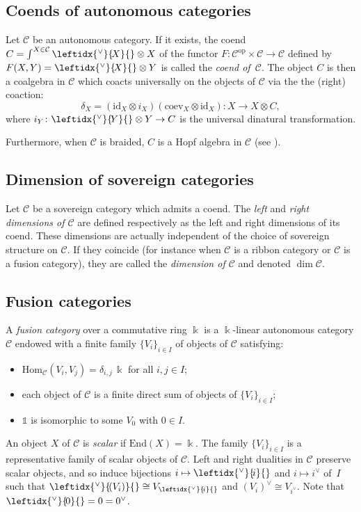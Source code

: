 \documentclass[a4paper]{amsart}
\theoremstyle{definition}
\newcommand{\co}{\colon}
\newcommand{\id}{\mathrm{id}}
\newcommand{\opp}{\mathrm{op}}
\newcommand{\cc}{\mathcal{C}}
\newcommand{\kk}{\Bbbk}
\newcommand{\kt}{$\Bbbk$\nobreakdash-\hspace{0pt}}
\newcommand{\un}{\mathbb{1}}
\newcommand{\End}{\mathrm{End}}
\newcommand{\Hom}{\mathrm{Hom}}
\newcommand{\lcoev}{\mathrm{coev}}
\newcommand{\ldual}[1]{\leftidx{^\vee}{\!#1}{}}
\newcommand{\rdual}[1]{{#1}^\vee}
\begin{document}
\subsection{Coends of autonomous categories}\label{sect-coend-cat}
Let $\cc$ be an autonomous category. If it exists, the coend $C=\int^{X \in \cc} \ldual{X} \otimes X$ of the functor $F\co
\cc^\opp \times \cc \to \cc$ defined by $F(X,Y)=\ldual{X}\otimes Y$ is called the \emph{coend of~$\cc$}. The object $C$ is
then a coalgebra in $\cc$ which coacts universally on the objects of $\cc$ via the the (right) coaction:
\begin{equation*}
\delta_X=(\id_X \otimes i_X)(\lcoev_X \otimes \id_X) \co X \to X \otimes C,
\end{equation*}
where $i_Y \co \ldual{Y} \otimes Y \to C$ is the universal dinatural transformation.

Furthermore, when $\cc$ is braided, $C$ is a Hopf algebra in $\cc$ (see \cite{Maj1,Lyu1}).

\subsection{Dimension of sovereign categories}
Let $\cc$ be a sovereign category which admits a coend. The \emph{left} and \emph{right dimensions of $\cc$} are defined respectively as the left and right dimensions of its coend. These dimensions are actually independent of the choice of sovereign structure on $\cc$. If they coincide (for instance when $\cc$ is a ribbon category or $\cc$ is a fusion category), they are called the \emph{dimension of $\cc$} and denoted $\dim \cc$.

\subsection{Fusion categories}\label{sect-fusion} A \emph{fusion category} over a commutative ring $\kk$ is
a \kt linear autonomous category $\cc$ endowed with a finite family $\{V_i\}_{i \in I}$ of objects of $\cc$ satisfying:
\begin{itemize}
\item $\Hom_\cc(V_i,V_j)=\delta_{i,j} \, \kk$ for all $i,j \in I$;
\item each object of $\cc$ is a finite direct sum of objects of $\{V_i\}_{i \in I}$;
\item $\un$ is isomorphic to some $V_0$ with $0 \in I$.
\end{itemize}

An object $X$ of $\cc$ is \emph{scalar} if  $\End(X)=\kk$. The family $\{V_i\}_{i \in I}$ is a representative family of scalar
objects of $\cc$.
Left and right dualities in $\cc$ preserve scalar objects, and so induce bijections $i \mapsto \ldual{i}$ and $i \mapsto \rdual{i}$ of~$I$ such
that $\ldual{(V_i)} \cong V_{\ldual{i}}$ and $\rdual{(V_i)} \cong V_{\rdual{i}}$. Note that $\ldual{0}=0=\rdual{0}$.
\end{document}
